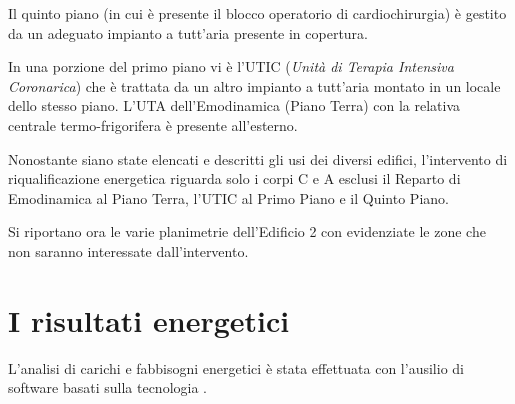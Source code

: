 	

Il quinto piano (in cui è presente il blocco operatorio di cardiochirurgia) è gestito da un adeguato impianto a tutt'aria presente in copertura.

In una porzione del primo piano vi è l'UTIC (\emph{Unità di Terapia Intensiva Coronarica}) che è trattata da un altro impianto a tutt'aria montato in un locale dello stesso piano. L'UTA dell'Emodinamica (Piano Terra) con la relativa centrale termo-frigorifera è presente all'esterno.

Nonostante siano state elencati e descritti gli usi dei diversi edifici, l'intervento di riqualificazione energetica riguarda solo i corpi C e A esclusi il Reparto di Emodinamica al Piano Terra, l'UTIC al Primo Piano e il Quinto Piano.

Si riportano ora le varie planimetrie dell'Edificio 2 con evidenziate le zone che non saranno interessate dall'intervento.

\label{PT}
\label{P1}
\label{P2}
\label{P3}
\label{P4}

\section{I risultati energetici}
L'analisi di carichi e fabbisogni energetici è stata effettuata con l'ausilio di software basati sulla tecnologia \bim.

